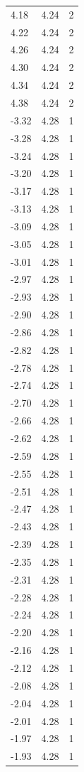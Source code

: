 \begin{longtable}{lrr}
  4.18 & 4.24 & 2 \\
  4.22 & 4.24 & 2 \\
  4.26 & 4.24 & 2 \\
  4.30 & 4.24 & 2 \\
  4.34 & 4.24 & 2 \\
  4.38 & 4.24 & 2 \\
  -3.32 & 4.28 & 1 \\
  -3.28 & 4.28 & 1 \\
  -3.24 & 4.28 & 1 \\
  -3.20 & 4.28 & 1 \\
  -3.17 & 4.28 & 1 \\
  -3.13 & 4.28 & 1 \\
  -3.09 & 4.28 & 1 \\
  -3.05 & 4.28 & 1 \\
  -3.01 & 4.28 & 1 \\
  -2.97 & 4.28 & 1 \\
  -2.93 & 4.28 & 1 \\
  -2.90 & 4.28 & 1 \\
  -2.86 & 4.28 & 1 \\
  -2.82 & 4.28 & 1 \\
  -2.78 & 4.28 & 1 \\
  -2.74 & 4.28 & 1 \\
  -2.70 & 4.28 & 1 \\
  -2.66 & 4.28 & 1 \\
  -2.62 & 4.28 & 1 \\
  -2.59 & 4.28 & 1 \\
  -2.55 & 4.28 & 1 \\
  -2.51 & 4.28 & 1 \\
  -2.47 & 4.28 & 1 \\
  -2.43 & 4.28 & 1 \\
  -2.39 & 4.28 & 1 \\
  -2.35 & 4.28 & 1 \\
  -2.31 & 4.28 & 1 \\
  -2.28 & 4.28 & 1 \\
  -2.24 & 4.28 & 1 \\
  -2.20 & 4.28 & 1 \\
  -2.16 & 4.28 & 1 \\
  -2.12 & 4.28 & 1 \\
  -2.08 & 4.28 & 1 \\
  -2.04 & 4.28 & 1 \\
  -2.01 & 4.28 & 1 \\
  -1.97 & 4.28 & 1 \\
  -1.93 & 4.28 & 1 \\

\end{longtable}
